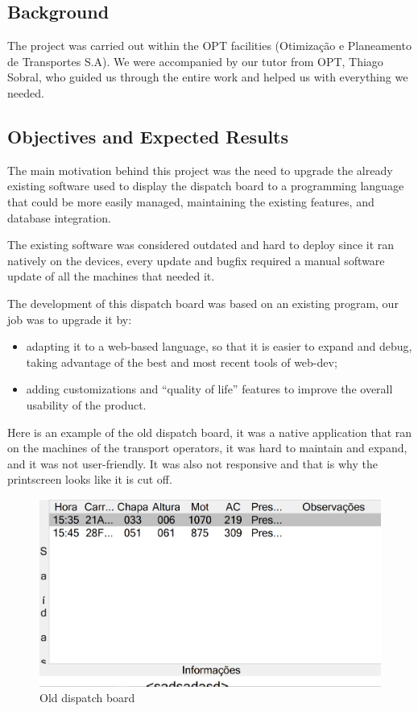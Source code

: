 \documentclass[10pt]{article}
\begin{document}
    \subsection{Background}
    The project was carried out within the OPT facilities (Otimização e Planeamento de Transportes S.A). We were accompanied by our tutor from OPT, Thiago Sobral, who guided us through the entire work and helped us with everything we needed.

    \subsection{Objectives and Expected Results}
        The main motivation behind this project was the need to upgrade the already existing software used to display the dispatch board to a programming language that could be more easily managed, maintaining the existing features, and database integration.
        
        The existing software was considered outdated and hard to deploy since it ran natively on the devices, every update and bugfix required a manual software update of all the machines that needed it.

        The development of this dispatch board was based on an existing program, our job was to upgrade it by:
        \begin{itemize}
            \item adapting it to a web-based language, so that it is easier to expand and debug, taking advantage of the best and most recent tools of web-dev;
            \item adding customizations and “quality of life” features to improve the overall usability of the product.
        \end{itemize}

        Here is an example of the old dispatch board, it was a native application that ran on the machines of the transport operators, it was hard to maintain and expand, and it was not user-friendly. It was also not responsive and that is why the printscreen looks like it is cut off.
        
        \vfill
        \begin{figure}[!ht]
            \centering
            \includegraphics[width=1\textwidth]{old_dispatch_board}
            \caption{Old dispatch board}
            \label{fig:old_dispatch_board}
        \end{figure}
        
\end{document}
